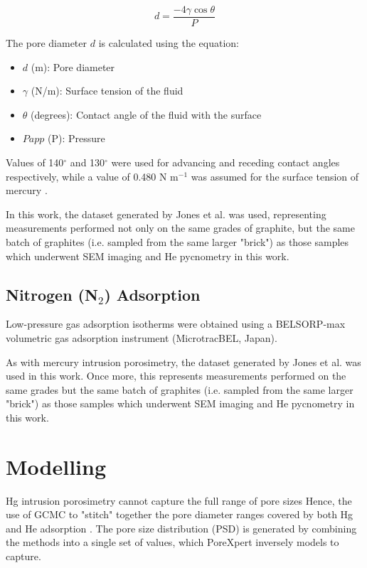 \documentclass[3p,twocolumn]{elsarticle}
\begin{document}
	\begin{equation} \label{eq:washburn}
		d = \frac{-4\gamma \cos \theta}{P}
	\end{equation}

		The pore diameter \(d\) is calculated using the equation:
	\begin{itemize}
		\item $d$ (m): Pore diameter
		\item $\gamma$ (N/m): Surface tension of the fluid
		\item $\theta$ (degrees): Contact angle of the fluid with the surface
		\item $Papp$ (P): Pressure
	\end{itemize}

Values of 140$^{\circ}$ and 130$^{\circ}$ were used for advancing and receding
contact angles respectively, while a value of 0.480 N m$^{-1}$ was assumed for the
surface tension of mercury \citep{VANBRAKEL19811}. 

In this work, the dataset generated by Jones et al. \citep{Jones2018} was used,
representing measurements performed not only on the same grades of graphite, but
the same batch of graphites (i.e. sampled from the same larger "brick") as those samples
which underwent SEM imaging and He pycnometry in this work.

\subsection{Nitrogen (N$_2$) Adsorption}
Low-pressure gas adsorption isotherms were obtained using a BELSORP-max
volumetric gas adsorption instrument (MicrotracBEL, Japan). 


As with mercury intrusion porosimetry, the dataset generated by Jones et al.
\citep{Jones2018} was used in this work. Once more, this represents
measurements performed on the same grades but the same
batch of graphites (i.e. sampled from the same larger "brick") as those samples which
underwent SEM imaging and He pycnometry in this work.

\section{{Modelling}}
Hg intrusion porosimetry cannot capture the full range of pore sizes
 Hence, the use of GCMC to "stitch" together the pore diameter
ranges covered by both Hg and He adsorption \citep{Jones2018}. The pore size distribution (PSD) is
generated by combining the methods into a single set of values, which PoreXpert
inversely models to capture. 

\clearpage


\end{document}

